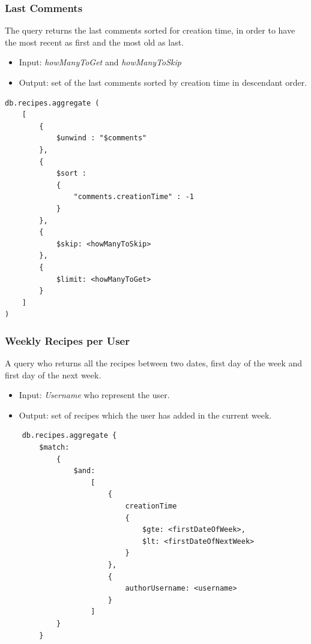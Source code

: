\documentclass[a4paper]{report}
\begin{document}
\subsubsection{Last Comments}
The query returns the last comments sorted for creation time, in order to have the most recent as first and the most old as last.

\begin{itemize}
	\item Input: \emph{howManyToGet} and \emph{howManyToSkip}
	\item Output: set of the last comments sorted by creation time in descendant order.
\end{itemize}

\begin{lstlisting}
db.recipes.aggregate (
	[
		{ 
			$unwind : "$comments" 
		},
		{ 
			$sort : 
			{ 
				"comments.creationTime" : -1 
			} 
		},
		{ 
			$skip: <howManyToSkip> 
		},
		{ 
			$limit: <howManyToGet> 
		}	
	]
)
\end{lstlisting}

\subsubsection{Weekly Recipes per User}
A query who returns all the recipes between two dates, first day of the week and first day of the next week.
\begin{itemize}
	\item Input: \emph{Username} who represent the user.
	\item Output: set of recipes which the user has added in the current week.
\end{itemize}

\begin{lstlisting}
	db.recipes.aggregate {
		$match: 
			{ 
				$and: 
					[
						{
							creationTime
							{ 
								$gte: <firstDateOfWeek>,
							 	$lt: <firstDateOfNextWeek>
							}
						},
					 	{
							authorUsername: <username>
						}
					]
			}
		}
\end{lstlisting}
\end{document}
